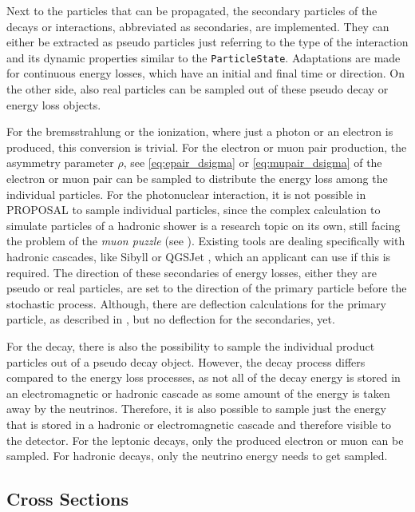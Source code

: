 Next to the particles that can be propagated, the secondary particles of the decays or interactions, abbreviated as secondaries, are implemented.
They can either be extracted as pseudo particles just referring to the type of the interaction and its dynamic properties similar to the \texttt{ParticleState}.
Adaptations are made for continuous energy losses, which have an initial and final time or direction.
On the other side, also real particles can be sampled out of these pseudo decay or energy loss objects.

For the bremsstrahlung or the ionization, where just a photon or an electron is produced, this conversion is trivial.
For the electron or muon pair production, the asymmetry parameter $\rho$, see \eqref{eq:epair_dsigma} or \eqref{eq:mupair_dsigma} of the electron or muon pair can be sampled to distribute the energy loss among the individual particles.
For the photonuclear interaction, it is not possible in PROPOSAL to sample individual particles, since the complex calculation to simulate particles of a hadronic shower is a research topic on its own, still facing the problem of the \textit{muon puzzle} (see ).
Existing tools are dealing specifically with hadronic cascades, like Sibyll \cite{Riehn20Sibyll} or QGSJet \cite{Ostapchenko10qgsjet}, which an applicant can use if this is required.
The direction of these secondaries of energy losses, either they are pseudo or real particles, are set to the direction of the primary particle before the stochastic process.
Although, there are deflection calculations for the primary particle, as described in , but no deflection for the secondaries, yet.

For the decay, there is also the possibility to sample the individual product particles out of a pseudo decay object.
However, the decay process differs compared to the energy loss processes, as not all of the decay energy is stored in an electromagnetic or hadronic cascade as some amount of the energy is taken away by the neutrinos.
Therefore, it is also possible to sample just the energy that is stored in a hadronic or electromagnetic cascade and therefore visible to the detector.
For the leptonic decays, only the produced electron or muon can be sampled.
For hadronic decays, only the neutrino energy needs to get sampled.

%

\subsection{Cross Sections}

